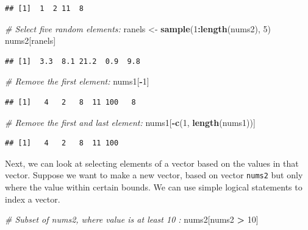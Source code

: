 \documentclass[]{book}
\newenvironment{Shaded}{\begin{snugshade}}{\end{snugshade}}
\newcommand{\CommentTok}[1]{\textcolor[rgb]{0.56,0.35,0.01}{\textit{#1}}}
\newcommand{\DecValTok}[1]{\textcolor[rgb]{0.00,0.00,0.81}{#1}}
\newcommand{\KeywordTok}[1]{\textcolor[rgb]{0.13,0.29,0.53}{\textbf{#1}}}
\newcommand{\NormalTok}[1]{#1}
\newcommand{\OperatorTok}[1]{\textcolor[rgb]{0.81,0.36,0.00}{\textbf{#1}}}
\newcommand{\StringTok}[1]{\textcolor[rgb]{0.31,0.60,0.02}{#1}}
\begin{document}
\begin{verbatim}
## [1]  1  2 11  8
\end{verbatim}

\begin{Shaded}
\begin{Highlighting}[]
\CommentTok{# Select five random elements:}
\NormalTok{ranels <-}\StringTok{ }\KeywordTok{sample}\NormalTok{(}\DecValTok{1}\OperatorTok{:}\KeywordTok{length}\NormalTok{(nums2), }\DecValTok{5}\NormalTok{)}
\NormalTok{nums2[ranels]}
\end{Highlighting}
\end{Shaded}

\begin{verbatim}
## [1]  3.3  8.1 21.2  0.9  9.8
\end{verbatim}

\begin{Shaded}
\begin{Highlighting}[]
\CommentTok{# Remove the first element:}
\NormalTok{nums1[}\OperatorTok{-}\DecValTok{1}\NormalTok{]}
\end{Highlighting}
\end{Shaded}

\begin{verbatim}
## [1]   4   2   8  11 100   8
\end{verbatim}

\begin{Shaded}
\begin{Highlighting}[]
\CommentTok{# Remove the first and last element:}
\NormalTok{nums1[}\OperatorTok{-}\KeywordTok{c}\NormalTok{(}\DecValTok{1}\NormalTok{, }\KeywordTok{length}\NormalTok{(nums1))]}
\end{Highlighting}
\end{Shaded}

\begin{verbatim}
## [1]   4   2   8  11 100
\end{verbatim}

Next, we can look at selecting elements of a vector based on the values in that vector. Suppose we want to make a new vector, based on vector \texttt{nums2} but only where the value within certain bounds. We can use simple logical statements to index a vector.

\begin{Shaded}
\begin{Highlighting}[]
\CommentTok{# Subset of nums2, where value is at least 10 :}
\NormalTok{nums2[nums2 }\OperatorTok{>}\StringTok{ }\DecValTok{10}\NormalTok{]}
\end{Highlighting}
\end{Shaded}
\end{document}
